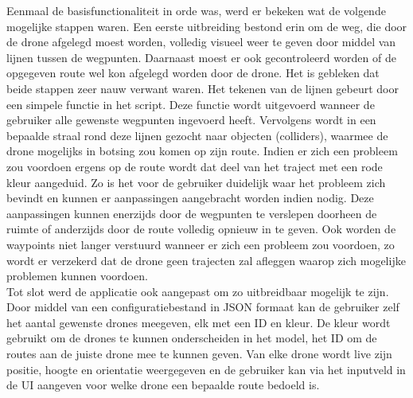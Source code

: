 Eenmaal de basisfunctionaliteit in orde was, werd er bekeken wat de volgende mogelijke stappen waren.
Een eerste uitbreiding bestond erin om de weg, die door de drone afgelegd moest worden, volledig visueel weer te geven door middel van lijnen tussen de wegpunten.
Daarnaast moest er ook gecontroleerd worden of de opgegeven route wel kon afgelegd worden door de drone.
Het is gebleken dat beide stappen zeer nauw verwant waren. Het tekenen van de lijnen gebeurt door een simpele functie in het script.
Deze functie wordt uitgevoerd wanneer de gebruiker alle gewenste wegpunten ingevoerd heeft.
Vervolgens wordt in een bepaalde straal rond deze lijnen gezocht naar objecten (colliders), waarmee de drone mogelijks in botsing zou komen op zijn route.
Indien er zich een probleem zou voordoen ergens op de route wordt dat deel van het traject met een rode kleur aangeduid.
Zo is het voor de gebruiker duidelijk waar het probleem zich bevindt en kunnen er aanpassingen aangebracht worden indien nodig.
Deze aanpassingen kunnen enerzijds door de wegpunten te verslepen doorheen de ruimte of anderzijds door de route volledig opnieuw in te geven.
Ook worden de waypoints niet langer verstuurd wanneer er zich een probleem zou voordoen, zo wordt er verzekerd dat de drone geen trajecten zal afleggen waarop zich mogelijke problemen kunnen voordoen.\\

Tot slot werd de applicatie ook aangepast om zo uitbreidbaar mogelijk te zijn.
Door middel van een configuratiebestand in JSON formaat kan de gebruiker zelf het aantal gewenste drones meegeven, elk met een ID en kleur.
De kleur wordt gebruikt om de drones te kunnen onderscheiden in het model, het ID om de routes aan de juiste drone mee te kunnen geven.
Van elke drone wordt live zijn positie, hoogte en orientatie weergegeven en de gebruiker kan via het inputveld in de UI aangeven voor welke drone een bepaalde route bedoeld is.